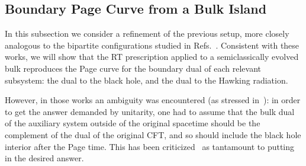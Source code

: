 \documentclass[12pt,letterpaper]{article}
\begin{document}
\subsection{Boundary Page Curve from a Bulk Island}
\label{sec-fancy}

In this subsection we consider a refinement of the previous setup, more closely analogous to the bipartite configurations studied in Refs.~\cite{Pen19,AEMM}. Consistent with these works, we will show that the RT prescription applied to a semiclassically evolved bulk reproduces the Page curve for the boundary dual of each relevant subsystem: the dual to the black hole, and the dual to the Hawking radiation.

However, in those works an ambiguity was encountered (as stressed in~\cite{AEMM}): in order to get the answer demanded by unitarity, one had to assume that the bulk dual of the auxiliary system outside of the original spacetime should be the complement of the dual of the original CFT, and so should include the black hole interior after the Page time. This has been criticized~\cite{AEMM,AMMZ} as tantamount to putting in the desired answer.
\end{document}
